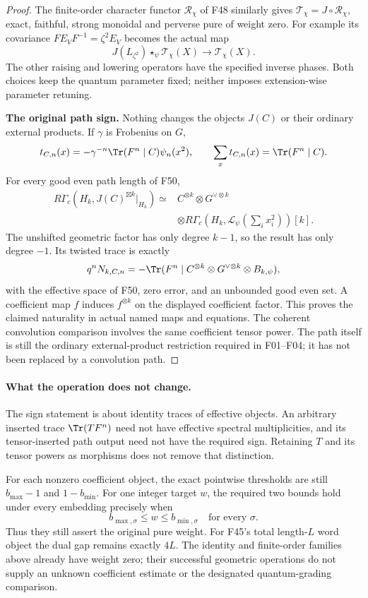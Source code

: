 \documentclass[11pt,a4paper]{article}
\newcommand{\fid}[1]{\textsf{#1}}\newcommand{\gate}[1]{\textsf{#1}}
\theoremstyle{named}\newtheorem{finding}{Finding}[section]
\theoremstyle{definition}\newtheorem{definition}[finding]{Definition}
\theoremstyle{remark}\newtheorem{remark}[finding]{Remark}
\begin{document}
\begin{proof}
The finite-order character functor $\mathcal R_\chi$
of \fid{F48} similarly gives
$\mathcal T_\chi=J\circ\mathcal R_\chi$, exact,
faithful, strong monoidal and perverse pure of weight zero.
For example its covariance
$FE_VF^{-1}=\zeta^2E_V$ becomes the actual map
\[
 J(L_{\zeta^2})\star_\psi\mathcal T_\chi(X)
       \longrightarrow\mathcal T_\chi(X).
\]
The other raising and lowering operators have the
specified inverse phases.
Both choices keep the quantum parameter fixed;
neither imposes extension-wise parameter retuning.

\par\smallskip\noindent\textbf{The original path sign.}\quad
Nothing changes the objects $J(C)$ or their ordinary
external products. If $\gamma$ is Frobenius on $G$,
\[
 t_{C,n}(x)=-\gamma^{-n}\Tr(F^n\mid C)\psi_n(x^2),
 \qquad \sum_x t_{C,n}(x)=\Tr(F^n\mid C).
\]
For every good even path length of \fid{F50},
\[
\begin{aligned}
 R\Gamma_c(H_k,J(C)^{\boxtimes k}|_{H_k})
 \simeq{}& C^{\otimes k}\otimes G^{\vee\otimes k}\\
 &\otimes
 R\Gamma_c(H_k,\mathcal L_\psi(\textstyle\sum_i x_i^2))[k].
\end{aligned}
\]
The unshifted geometric factor has only degree $k-1$,
so the result has only degree $-1$.
Its twisted trace is exactly
\[
 q^nN_{k,C,n}
   =-\Tr(F^n\mid
       C^{\otimes k}\otimes G^{\vee\otimes k}\otimes B_{k,\psi}),
\]
with the effective space of \fid{F50}, zero error,
and an unbounded good even set.
A coefficient map $f$ induces $f^{\otimes k}$ on
the displayed coefficient factor. This proves the
claimed naturality in actual named maps and equations.
The coherent convolution comparison involves the
same coefficient tensor power.
The path itself is still the ordinary external-product
restriction required in \fid{F01}--\fid{F04};
it has not been replaced by a convolution path.
\end{proof}

\paragraph{What the operation does not change.}
The sign statement is about identity traces of effective
objects. An arbitrary inserted trace $\Tr(TF^n)$ need
not have effective spectral multiplicities, and its
tensor-inserted path output need not have the required
sign. Retaining $T$ and its tensor powers as morphisms
does not remove that distinction.

For each nonzero coefficient object, the exact pointwise
thresholds are still $b_{\max}-1$ and $1-b_{\min}$.
For one integer target $w$, the required two bounds
hold under every embedding precisely when
\[
 b_{\max,\sigma}\le w\le b_{\min,\sigma}
                    \quad\text{for every }\sigma.
\]
Thus they still assert the original pure weight.
For \fid{F45}'s total length-$L$ word object the
dual gap remains exactly $4L$.
The identity and finite-order families above already
have weight zero; their successful geometric operations
do not supply an unknown coefficient estimate or the
designated quantum-grading comparison.
\end{document}
